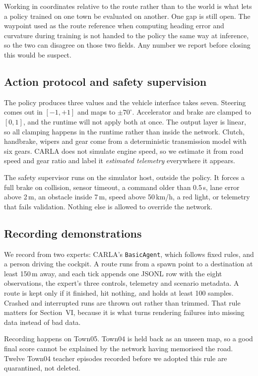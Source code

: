 \documentclass[conference]{IEEEtran}
\begin{document}
Working in coordinates relative to the route rather than to the world is
what lets a policy trained on one town be evaluated on another. One gap
is still open. The waypoint used as the route reference when computing
heading error and curvature during training is not handed to the policy
the same way at inference, so the two can disagree on those two fields.
Any number we report before closing this would be suspect.

\subsection{Action protocol and safety supervision}

The policy produces three values and the vehicle interface takes seven.
Steering comes out in $[-1,+1]$ and maps to $\pm70^{\circ}$. Accelerator
and brake are clamped to $[0,1]$, and the runtime will not apply both at
once. The output layer is linear, so all clamping happens in the runtime
rather than inside the network. Clutch, handbrake, wipers and gear come
from a deterministic transmission model with six gears. CARLA does not
simulate engine speed, so we estimate it from road speed and gear ratio
and label it \emph{estimated telemetry} everywhere it appears.

The safety supervisor runs on the simulator host, outside the policy. It
forces a full brake on collision, sensor timeout, a command older than
0.5\,s, lane error above 2\,m, an obstacle inside 7\,m, speed above
50\,km/h, a red light, or telemetry that fails validation. Nothing else
is allowed to override the network.

\subsection{Recording demonstrations}

We record from two experts: CARLA's \texttt{BasicAgent}, which follows
fixed rules, and a person driving the cockpit. A route runs from a spawn
point to a destination at least 150\,m away, and each tick appends one
JSONL row with the eight observations, the expert's three controls,
telemetry and scenario metadata. A route is kept only if it finished,
hit nothing, and holds at least 100 samples. Crashed and interrupted
runs are thrown out rather than trimmed. That rule matters for
Section~VI, because it is what turns rendering failures into missing
data instead of bad data.

Recording happens on Town05. Town04 is held back as an unseen map, so a
good final score cannot be explained by the network having memorised the
road. Twelve Town04 teacher episodes recorded before we adopted this
rule are quarantined, not deleted.
\end{document}
